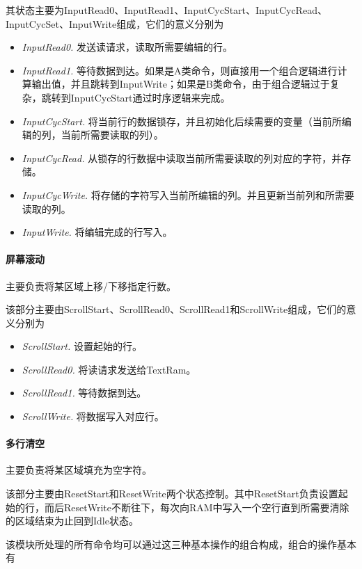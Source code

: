其状态主要为InputRead0、InputRead1、InputCycStart、InputCycRead、InputCycSet、InputWrite组成，它们的意义分别为

\begin{itemize}
	\item \textit{InputRead0.} 发送读请求，读取所需要编辑的行。
	\item \textit{InputRead1.} 等待数据到达。如果是A类命令，则直接用一个组合逻辑进行计算输出值，并且跳转到InputWrite；如果是B类命令，由于组合逻辑过于复杂，跳转到InputCycStart通过时序逻辑来完成。
	\item \textit{InputCycStart.} 将当前行的数据锁存，并且初始化后续需要的变量（当前所编辑的列，当前所需要读取的列）。
	\item \textit{InputCycRead.} 从锁存的行数据中读取当前所需要读取的列对应的字符，并存储。
	\item \textit{InputCycWrite.} 将存储的字符写入当前所编辑的列。并且更新当前列和所需要读取的列。
	\item \textit{InputWrite.} 将编辑完成的行写入。
\end{itemize}

\paragraph{屏幕滚动}
主要负责将某区域上移/下移指定行数。

该部分主要由ScrollStart、ScrollRead0、ScrollRead1和ScrollWrite组成，它们的意义分别为

\begin{itemize}
	\item \textit{ScrollStart.} 设置起始的行。
	\item \textit{ScrollRead0.} 将读请求发送给TextRam。
	\item \textit{ScrollRead1.} 等待数据到达。
	\item \textit{ScrollWrite.} 将数据写入对应行。
\end{itemize}

\paragraph{多行清空}
主要负责将某区域填充为空字符。

该部分主要由ResetStart和ResetWrite两个状态控制。其中ResetStart负责设置起始的行，而后ResetWrite不断往下，每次向RAM中写入一个空行直到所需要清除的区域结束为止回到Idle状态。

该模块所处理的所有命令均可以通过这三种基本操作的组合构成，组合的操作基本有

